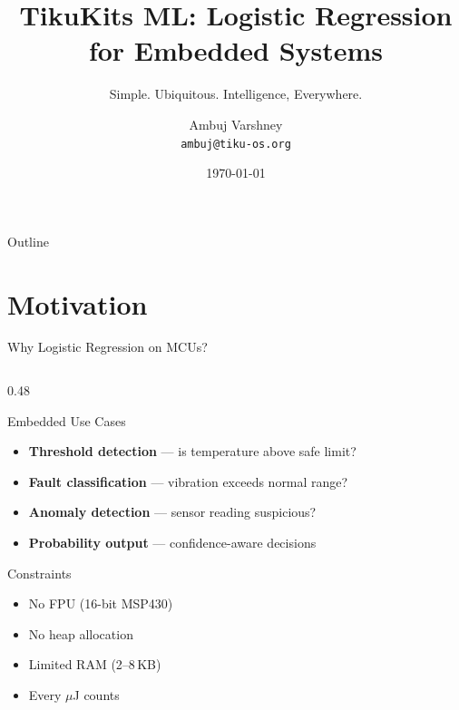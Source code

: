 \documentclass[aspectratio=169, 10pt]{beamer}
\title[TikuKits ML]{TikuKits ML: Logistic Regression for Embedded Systems}
\subtitle{Simple. Ubiquitous. Intelligence, Everywhere.}
\author[Ambuj Varshney]{Ambuj Varshney \\ \texttt{ambuj@tiku-os.org}}
\date{\today}
\begin{document}
\begin{frame}
\titlepage
\end{frame}

\begin{frame}{Outline}
\tableofcontents
\end{frame}

\section{Motivation}

\begin{frame}{Why Logistic Regression on MCUs?}
\begin{columns}[T]
\begin{column}{0.48\textwidth}
\begin{block}{Embedded Use Cases}
\begin{itemize}
  \item \textbf{Threshold detection} --- is temperature above safe limit?
  \item \textbf{Fault classification} --- vibration exceeds normal range?
  \item \textbf{Anomaly detection} --- sensor reading suspicious?
  \item \textbf{Probability output} --- confidence-aware decisions
\end{itemize}
\end{block}

\begin{block}{Constraints}
\begin{itemize}
  \item No FPU (16-bit MSP430)
  \item No heap allocation
  \item Limited RAM (2--8\,KB)
  \item Every $\mu$J counts
\end{itemize}
\end{block}
\end{column}


\end{columns}
\end{frame}
\end{document}
